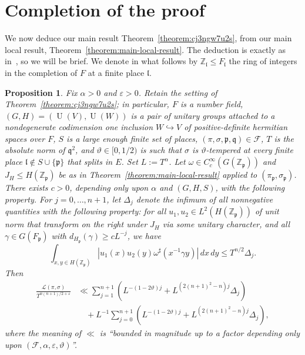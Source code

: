 \documentclass[reqno]{amsart}
\def\eps{\varepsilon}
\DeclareMathOperator{\U}{U}
\theoremstyle{plain} \newtheorem{theorem} {Theorem} \newtheorem{conjecture} {Conjecture} \newtheorem{corollary} [theorem] {Corollary} \newtheorem{proposition} [theorem] {Proposition} \newtheorem{fact} [theorem] {Fact}
\theoremstyle{definition} \newtheorem{definition} [theorem] {Definition}
\theoremstyle{itplain} %
\newcommand{\mfq}{\mathfrak{q}}
\newcommand{\mfp}{\mathfrak{p}}
\newcommand{\mfop}{\mathfrak{l}}
\begin{document}
\section{Completion of the proof}\label{Sec:final}
We now deduce our main result Theorem~\ref{theorem:cj3ngw7u2s}, from our main local result, Theorem~\ref{theorem:main-local-result}.  The deduction is exactly as in~\cite[\S6]{2020arXiv201202187N}, so we will be brief.  We denote in what follows by $\mathbb{Z}_{\mathfrak{l}} \leq F_{\mathfrak{l}}$ the ring of integers in the completion of $F$ at a finite place $\mathfrak{l}$.
\begin{proposition}\label{proposition:20230517165122}
  Fix $\alpha > 0$ and $\eps > 0$.  Retain the setting of Theorem~\ref{theorem:cj3ngw7u2s}; in particular, $F$ is a number field, $(G,H) = (\U(V), \U(W))$ is a pair of unitary groups attached to a nondegenerate codimension one inclusion $W \hookrightarrow V$ of positive-definite hermitian spaces over $F$, $S$ is a large enough finite set of places, $(\pi,\sigma,\mfp,\mfq) \in \mathcal{F}$, $T$ is the absolute norm of $\mathfrak{q}^2$, and $\vartheta \in [0,1/2)$ is such that $\sigma$ is $\vartheta$-tempered at every finite place $\mfop \notin S \cup \{\mfp\}$ that splits in $E$.  Set $L := T^{\alpha}$.  Let $\omega \in C_c^\infty(G(\mathbb{Z}_\mfp))$ and $J_H \leq H(\mathbb{Z}_\mfp)$ be as in Theorem~\ref{theorem:main-local-result} applied to $(\pi_\mfp,\sigma_\mfp)$.
  There exists $c > 0$, depending only upon $\alpha$ and $(G,H,S)$, with the following property.  For $j=0,\dotsc,n+1$, let $\Delta_j$ denote the infimum of all nonnegative quantities with the following property: for all $u_1, u_2 \in L^2(H(\mathbb{Z}_\mfp))$ of unit norm that transform on the right under $J_H$ via some unitary character, and all $\gamma \in G(F_\mfp)$ with $d_{H_\mfp}(\gamma) \geq c L^{-j}$, we have
  \begin{equation}\label{eqn:20230517152904}
    \int_{x, y \in H(\mathbb{Z}_\mfp)}
    \left\lvert
      u_1(x)
      u_2(y)
      \omega^\sharp (x^{-1} \gamma y )
    \right\rvert
    \, d x \, d y
    \leq T^{n / 2} \Delta_j.
  \end{equation}
  Then
  \begin{align*}
    \frac{\mathcal{L} (\pi,\sigma)}{T^{n(n+1)/2 + \eps}}
    &\ll
      \sum _{j=1}^{n+1}
      \left(
      L^{-(1-2 \vartheta) j}
      +
      L^{(2 {(n+1)}^2 - n)j}
      \Delta_j
      \right)\\
    &\quad +
      L^{-1}
      \sum _{j=0}^{n+1}
      \left(
      L^{-(1-2 \vartheta) j}
      +
      L^{(2 {(n+1)}^2 - n )j}
      \Delta_j
      \right),
  \end{align*}
  where the meaning of $\ll$ is ``bounded in magnitude up to a factor depending only upon $(\mathcal{F},\alpha,\eps, \vartheta)$''.
\end{proposition}
\end{document}

